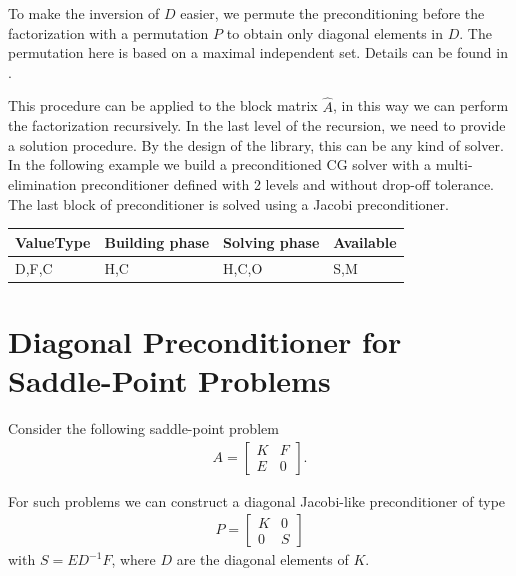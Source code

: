 To make the inversion of $D$ easier, we permute the preconditioning before the factorization with a permutation $P$ to obtain only diagonal elements in $D$. The permutation here is based on a maximal independent set. Details can be found in \cite{SAAD}.


This procedure can be applied to the block matrix $\hat{A}$, in this way we can perform the factorization recursively. In the last level of the recursion, we need to provide a solution procedure. By the design of the library, this can be any kind of solver. In the following example we build a preconditioned CG solver with a multi-elimination preconditioner defined with 2 levels and without drop-off tolerance. The last block of preconditioner is solved using a Jacobi preconditioner.

\begin{table}[H]
\begin{tabular}{l|l|l|l}
\multicolumn{1}{c|}{ValueType} & Building phase & Solving phase & Available \\ \hline
D,F,C                          & H,C            & H,C,O         & S,M      
\end{tabular}
\end{table}



\section{Diagonal Preconditioner for Saddle-Point Problems}

Consider the following saddle-point problem
\begin{eqnarray}
A =\left[
\begin{array}{cc}  
K & F \\ 
E & 0 
\end{array}\right].
\end{eqnarray}

For such problems we can construct a diagonal Jacobi-like preconditioner of type
\begin{eqnarray}
P =\left[
\begin{array}{cc}  
K & 0 \\ 
0 & S 
\end{array}\right]
\end{eqnarray}
with $S=E D^{-1} F$, where $D$ are the diagonal elements of $K$.\\

